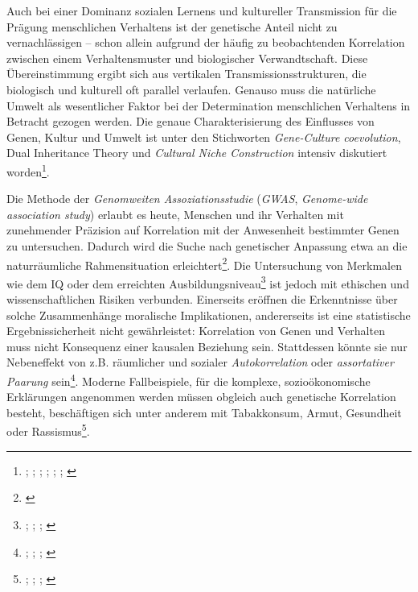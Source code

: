 \documentclass[openany,twoside,twocolumn]{book}
\let\rmarkdownfootnote\footnote%
\def\footnote{\protect\rmarkdownfootnote}
\begin{document}
Auch bei einer Dominanz sozialen Lernens und kultureller Transmission
für die Prägung menschlichen Verhaltens ist der genetische Anteil nicht
zu vernachlässigen -- schon allein aufgrund der häufig zu beobachtenden
Korrelation zwischen einem Verhaltensmuster und biologischer
Verwandtschaft. Diese Übereinstimmung ergibt sich aus vertikalen
Transmissionsstrukturen, die biologisch und kulturell oft parallel
verlaufen. Genauso muss die natürliche Umwelt als wesentlicher Faktor
bei der Determination menschlichen Verhaltens in Betracht gezogen
werden. Die genaue Charakterisierung des Einflusses von Genen, Kultur
und Umwelt ist unter den Stichworten \emph{Gene-Culture coevolution},
Dual Inheritance Theory und \emph{Cultural Niche Construction} intensiv
diskutiert worden\footnote{\textcite{aoki_gene-culture_2017};
  \textcite{boyd_culture_1985}; \textcite{cavalli-sforza_cultural_1981};
  \textcite{chudek_culturegene_2011}; \textcite{feldman_aspects_1979};
  \textcite{mesoudi_towards_2006}; \textcite{richerson_dual_1978}}.

Die Methode der \emph{Genomweiten Assoziationsstudie} (\emph{GWAS},
\emph{Genome-wide association study}) erlaubt es heute, Menschen und ihr
Verhalten mit zunehmender Präzision auf Korrelation mit der Anwesenheit
bestimmter Genen zu untersuchen. Dadurch wird die Suche nach genetischer
Anpassung etwa an die naturräumliche Rahmensituation
erleichtert\footnote{\textcite{berg_population_2014}}. Die Untersuchung
von Merkmalen wie dem IQ oder dem erreichten Ausbildungsniveau\footnote{\textcite{benyamin_childhood_2014};
  \textcite{davies_genome-wide_2011}; \textcite{minkov_genetic_2015};
  \textcite{okbay_genome-wide_2016}} ist jedoch mit ethischen und
wissenschaftlichen Risiken verbunden. Einerseits eröffnen die
Erkenntnisse über solche Zusammenhänge moralische Implikationen,
andererseits ist eine statistische Ergebnissicherheit nicht
gewährleistet: Korrelation von Genen und Verhalten muss nicht Konsequenz
einer kausalen Beziehung sein. Stattdessen könnte sie nur Nebeneffekt
von z.B. räumlicher und sozialer \emph{Autokorrelation} oder
\emph{assortativer Paarung} sein\footnote{\textcite{abdellaoui_educational_2015};
  \textcite{domingue_genetic_2014}; \textcite{okbay_genome-wide_2016};
  \textcite{piffer_review_2015}}. Moderne Fallbeispiele, für die
komplexe, sozioökonomische Erklärungen angenommen werden müssen obgleich
auch genetische Korrelation besteht, beschäftigen sich unter anderem mit
Tabakkonsum, Armut, Gesundheit oder Rassismus\footnote{\textcite{maes_genetic_2006};
  \textcite{marden_african_2016};
  \textcite{nugent_geneenvironment_2011};
  \textcite{paradies_racism_2015}}.
\end{document}
